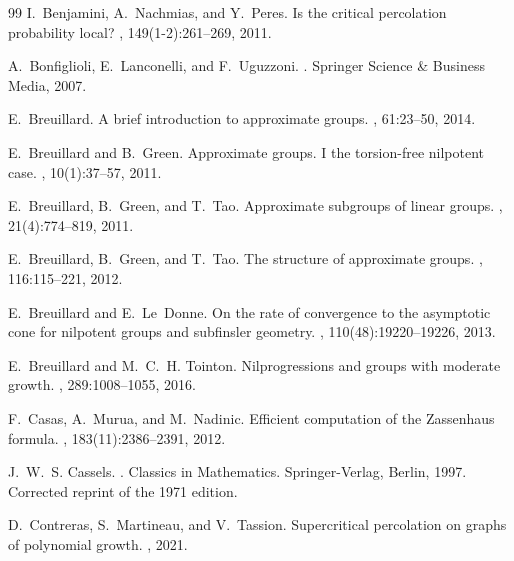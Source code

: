\documentclass[11pt]{article}
\numberwithin{equation}{section}
\theoremstyle{plain}
\theoremstyle{definition}
\theoremstyle{remark}
\numberwithin{equation}{section}
\numberwithin{equation}{section}
\begin{document}
\begin{thebibliography}{99}
I.~Benjamini, A.~Nachmias, and Y.~Peres.
\newblock Is the critical percolation probability local?
, 149(1-2):261--269, 2011.

A.~Bonfiglioli, E.~Lanconelli, and F.~Uguzzoni.
.
\newblock Springer Science \& Business Media, 2007.

E.~Breuillard.
\newblock A brief introduction to approximate groups.
, 61:23--50, 2014.

E.~Breuillard and B.~Green.
\newblock Approximate groups. {I} the torsion-free nilpotent case.
,
  10(1):37--57, 2011.

E.~Breuillard, B.~Green, and T.~Tao.
\newblock Approximate subgroups of linear groups.
, 21(4):774--819, 2011.

E.~Breuillard, B.~Green, and T.~Tao.
\newblock The structure of approximate groups.
, 116:115--221, 2012.

E.~Breuillard and E.~Le~Donne.
\newblock On the rate of convergence to the asymptotic cone for nilpotent
  groups and subfinsler geometry.
,
  110(48):19220--19226, 2013.

E.~Breuillard and M.~C.~H. Tointon.
\newblock Nilprogressions and groups with moderate growth.
, 289:1008--1055, 2016.

F.~Casas, A.~Murua, and M.~Nadinic.
\newblock Efficient computation of the {Z}assenhaus formula.
, 183(11):2386--2391, 2012.

J.~W.~S. Cassels.
.
\newblock Classics in Mathematics. Springer-Verlag, Berlin, 1997.
\newblock Corrected reprint of the 1971 edition.

D.~Contreras, S.~Martineau, and V.~Tassion.
\newblock Supercritical percolation on graphs of polynomial growth.
, 2021.


\end{thebibliography}
\end{document}
